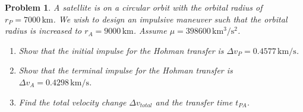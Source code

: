 \documentclass[10pt]{article}
\theoremstyle{plain}\theorembodyfont{\normalfont}
\newtheorem{prob}{Problem}[section]
\newenvironment{subprob}%
{\renewcommand{\theenumi}{\alph{enumi}}\renewcommand{\labelenumi}{(\theenumi)}\begin{enumerate}}%
{\end{enumerate}}%
\begin{document}
%
%
%
%



\begin{prob}
A satellite is on a circular orbit with the orbital radius of $r_P=7000\,\mathrm{km}$. We wish to design an impulsive maneuver such that the orbital radius is increased to $r_A=9000\,\mathrm{km}$. Assume $\mu=398600\,\mathrm{km^3/s^2}$. 
\begin{subprob}
\item Show that the initial impulse for the Hohman transfer is $\Delta v_P = 0.4577\,\mathrm{km/s}$.
\item Show that the terminal impulse for the Hohman transfer is $\Delta v_A = 0.4298\,\mathrm{km/s}$.
\item Find the total velocity change $\Delta v_{total}$ and the transfer time $t_{PA}$. 
\end{subprob}
\end{prob}
\end{document}
